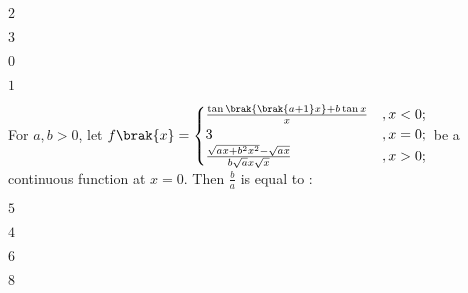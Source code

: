 \begin{enumerate}
\begin{multicols}{4}
\item $2$
\item $3$
\item $0$
\item $1$
\end{multicols}
\end{enumerate}
\item %
For $a, b >0$,  let $f\brak{x}= 
\begin{cases}
\frac{\tan{\brak{\brak{a+1}x}}+b\tan{x}}{x} &, x < 0; \\
3 &,  x = 0; \\
\frac{\sqrt{ax+b^2x^2} - \sqrt{ax}}{b\sqrt{a}x\sqrt{x}} &,  x>0;
\end{cases} $ 
be a continuous function at $x=0$. Then $\frac{b}{a}$ is equal to :
\begin{enumerate}
\begin{multicols}{4}
\item $5$
\item $4$
\item $6$
\item $8$
\end{multicols}
\end{enumerate}




